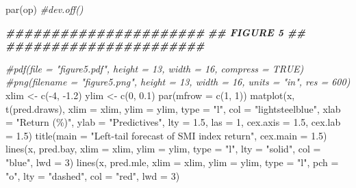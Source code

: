 \documentclass[
]{article}
\newenvironment{Shaded}{\begin{snugshade}}{\end{snugshade}}
\newcommand{\AttributeTok}[1]{\textcolor[rgb]{0.77,0.63,0.00}{#1}}
\newcommand{\CommentTok}[1]{\textcolor[rgb]{0.56,0.35,0.01}{\textit{#1}}}
\newcommand{\DecValTok}[1]{\textcolor[rgb]{0.00,0.00,0.81}{#1}}
\newcommand{\DocumentationTok}[1]{\textcolor[rgb]{0.56,0.35,0.01}{\textbf{\textit{#1}}}}
\newcommand{\FloatTok}[1]{\textcolor[rgb]{0.00,0.00,0.81}{#1}}
\newcommand{\FunctionTok}[1]{\textcolor[rgb]{0.00,0.00,0.00}{#1}}
\newcommand{\NormalTok}[1]{#1}
\newcommand{\OtherTok}[1]{\textcolor[rgb]{0.56,0.35,0.01}{#1}}
\newcommand{\SpecialCharTok}[1]{\textcolor[rgb]{0.00,0.00,0.00}{#1}}
\newcommand{\StringTok}[1]{\textcolor[rgb]{0.31,0.60,0.02}{#1}}
\begin{document}
\begin{Shaded}
\begin{Highlighting}[]
\FunctionTok{par}\NormalTok{(op)}
\CommentTok{\#dev.off()}
\end{Highlighting}
\end{Shaded}

\begin{Shaded}
\begin{Highlighting}[]
\DocumentationTok{\#\#\#\#\#\#\#\#\#\#\#\#\#\#\#\#\#\#\#\#\#\#}
\DocumentationTok{\#\#     FIGURE 5     \#\#}
\DocumentationTok{\#\#\#\#\#\#\#\#\#\#\#\#\#\#\#\#\#\#\#\#\#\#}

\CommentTok{\#pdf(file = "figure5.pdf", height = 13, width = 16, compress = TRUE)}
\CommentTok{\#png(filename = "figure5.png", height = 13, width = 16, units = "in", res = 600)}
\NormalTok{xlim }\OtherTok{\textless{}{-}} \FunctionTok{c}\NormalTok{(}\SpecialCharTok{{-}}\DecValTok{4}\NormalTok{, }\SpecialCharTok{{-}}\FloatTok{1.2}\NormalTok{)}
\NormalTok{ylim }\OtherTok{\textless{}{-}} \FunctionTok{c}\NormalTok{(}\DecValTok{0}\NormalTok{, }\FloatTok{0.1}\NormalTok{)}
\FunctionTok{par}\NormalTok{(}\AttributeTok{mfrow =} \FunctionTok{c}\NormalTok{(}\DecValTok{1}\NormalTok{, }\DecValTok{1}\NormalTok{))}
\FunctionTok{matplot}\NormalTok{(x, }\FunctionTok{t}\NormalTok{(pred.draws), }\AttributeTok{xlim =}\NormalTok{ xlim, }\AttributeTok{ylim =}\NormalTok{ ylim,}
        \AttributeTok{type =} \StringTok{"l"}\NormalTok{, }\AttributeTok{col =} \StringTok{"lightsteelblue"}\NormalTok{,}
        \AttributeTok{xlab =} \StringTok{"Return (\%)"}\NormalTok{, }\AttributeTok{ylab =} \StringTok{"Predictives"}\NormalTok{,}
        \AttributeTok{lty =} \FloatTok{1.5}\NormalTok{, }\AttributeTok{las =} \DecValTok{1}\NormalTok{, }\AttributeTok{cex.axis =} \FloatTok{1.5}\NormalTok{, }\AttributeTok{cex.lab =} \FloatTok{1.5}\NormalTok{)}
\FunctionTok{title}\NormalTok{(}\AttributeTok{main =} \StringTok{"Left{-}tail forecast of SMI index return"}\NormalTok{, }\AttributeTok{cex.main =} \FloatTok{1.5}\NormalTok{)}
\FunctionTok{lines}\NormalTok{(x, pred.bay, }\AttributeTok{xlim =}\NormalTok{ xlim, }\AttributeTok{ylim =}\NormalTok{ ylim,}
      \AttributeTok{type =} \StringTok{"l"}\NormalTok{, }\AttributeTok{lty =} \StringTok{"solid"}\NormalTok{, }\AttributeTok{col =} \StringTok{"blue"}\NormalTok{, }\AttributeTok{lwd =} \DecValTok{3}\NormalTok{)}
\FunctionTok{lines}\NormalTok{(x, pred.mle, }\AttributeTok{xlim =}\NormalTok{ xlim, }\AttributeTok{ylim =}\NormalTok{ ylim,}
      \AttributeTok{type =} \StringTok{"l"}\NormalTok{, }\AttributeTok{pch =} \StringTok{"o"}\NormalTok{, }\AttributeTok{lty =} \StringTok{"dashed"}\NormalTok{, }\AttributeTok{col =} \StringTok{"red"}\NormalTok{, }\AttributeTok{lwd =} \DecValTok{3}\NormalTok{)}

\end{Highlighting}
\end{Shaded}
\end{document}
